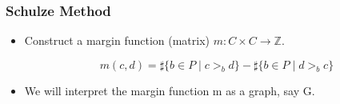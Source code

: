 \documentclass{beamer}
\begin{document}
%
%
%
%

\begin{frame}
\frametitle{Schulze Method}
\begin{itemize}

\item Construct a margin function (matrix) $m: C \times C \to \mathbb{Z}$. 

\[
  m(c, d) = \sharp \lbrace b \in P \mid c >_b d \rbrace -
            \sharp \lbrace b \in P \mid d >_b c \rbrace
\] 
\item We will interpret the margin function m as a graph, say G.
\end{itemize}
\end{frame}

\end{document}
